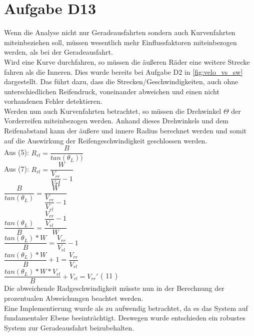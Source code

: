 \chapter{Aufgabe D13}

Wenn die Analyse nicht nur Geradeausfahrten sondern auch Kurvenfahrten miteinbeziehen soll, müssen wesentlich mehr Einflussfaktoren miteinbezogen werden, als bei der Geradeausfahrt.\\
Wird eine Kurve durchfahren, so müssen die äußeren Räder eine weitere Strecke fahren als die Inneren. Dies wurde bereits bei Aufgabe D2 in \autoref{fig:velo_vs_sw} dargestellt. Das führt dazu, dass die Strecken/Geschwindigkeiten, auch ohne unterschiedlichen Reifendruck, voneinander abweichen und einen nicht vorhandenen Fehler detektieren.\\
Werden nun auch Kurvenfahrten betrachtet, so müssen die Drehwinkel $\Theta$ der Vorderreifen miteinbezogen werden. Anhand dieses Drehwinkels und dem Reifenabstand kann der äußere und innere Radius berechnet werden und somit auf die Auswirkung der Reifengeschwindigkeit geschlossen werden. \\

Aus (5): $R_{rl} = \dfrac{B}{tan(\theta_{L}))}$\\

Aus (7): $R_{rl} =  \dfrac{W}{\dfrac{V_{rr}}{V{rl}} -1}$\\

\hspace*{2.5cm} $\dfrac{B}{tan(\theta_{L})} = \dfrac{W}{\dfrac{V_{rr}}{V_{rl}}-1}$\\

\hspace*{2.5cm} $\dfrac{tan(\theta_{L})}{B} = \dfrac{\dfrac{V_{rr}}{V_{rl}} -1}{W}$\\

\hspace*{2.5cm} $\dfrac{tan(\theta_{L})*W}{B} = \dfrac{V_{rr}}{V_{rl}}-1$\\

\hspace*{2.5cm} $\dfrac{ tan(\theta_{L})*W}{B}+1 = \dfrac{V_{rr}}{V_{rl}}$\\

\hspace*{2.5cm} $\dfrac{ tan(\theta_{L})*W*V_{rl}}{B}+V_{rl} = V_{rr}'$  ( 11 )\\


 Die abweichende Radgeschwindigkeit müsste nun in der Berechnung der prozentualen Abweichungen beachtet werden.\\
 Eine Implementierung wurde als zu aufwendig betrachtet, da es das System auf fundamentaler Ebene beeinträchtigt. Deswegen wurde entschieden ein robustes System zur Geradeausfahrt beizubehalten.
 
